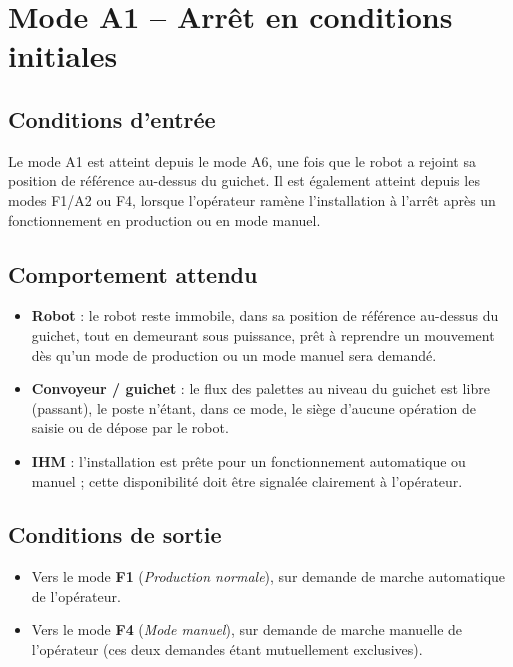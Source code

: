 \section{Mode A1 -- Arrêt en conditions initiales}
\label{secModeA1}

\subsection{Conditions d'entrée}

Le mode A1 est atteint depuis le mode A6, une fois que le robot a rejoint
sa position de référence au-dessus du guichet. Il est également atteint
depuis les modes F1/A2 ou F4, lorsque l'opérateur ramène l'installation à
l'arrêt après un fonctionnement en production ou en mode manuel.

\subsection{Comportement attendu}

\begin{itemize}
    \item \textbf{Robot} : le robot reste immobile, dans sa position de
    référence au-dessus du guichet, tout en demeurant sous puissance, prêt
    à reprendre un mouvement dès qu'un mode de production ou un mode
    manuel sera demandé.
    \item \textbf{Convoyeur / guichet} : le flux des palettes au niveau du
    guichet est libre (passant), le poste n'étant, dans ce mode, le siège
    d'aucune opération de saisie ou de dépose par le robot.
    \item \textbf{IHM} : l'installation est prête pour un fonctionnement
    automatique ou manuel ; cette disponibilité doit être signalée
    clairement à l'opérateur.
\end{itemize}

\subsection{Conditions de sortie}

\begin{itemize}
    \item Vers le mode \textbf{F1} (\emph{Production normale}), sur
    demande de marche automatique de l'opérateur.
    \item Vers le mode \textbf{F4} (\emph{Mode manuel}), sur demande de
    marche manuelle de l'opérateur (ces deux demandes étant mutuellement
    exclusives).
\end{itemize}
